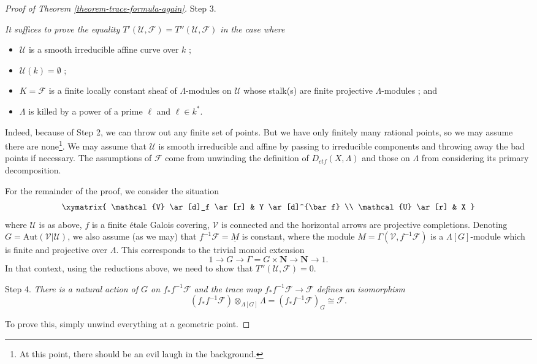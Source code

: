 \begin{proof}[Proof of Theorem \ref{theorem-trace-formula-again}]
\medskip\noindent
Step 3. {\it It suffices to prove the equality
$T'(\mathcal{U}, \mathcal{F}) = T''(\mathcal{U}, \mathcal{F})$
in the case where
\begin{itemize}
\item $\mathcal{U}$ is a smooth irreducible affine curve over $k$ ;
\item $\mathcal{U}(k) = \emptyset$ ;
\item $K=\mathcal{F}$ is a finite locally constant sheaf of $\Lambda$-modules
on $\mathcal{U}$ whose stalk(s) are finite projective $\Lambda$-modules ; and
\item $\Lambda$ is killed by a power of a prime $\ell$ and $\ell \in k^*$.
\end{itemize}
}

\medskip\noindent
Indeed, because of Step 2, we can throw out any finite set of points. But we
have only finitely many rational points, so we may assume there are
none\footnote{At this point, there should be an evil laugh in the background.}.
We may assume that $\mathcal{U}$ is smooth irreducible and affine by passing to
irreducible components and throwing away the bad points if necessary. The
assumptions of $\mathcal{F}$ come from unwinding the definition of
$D_{ctf}(X, \Lambda)$ and those on $\Lambda$ from considering its primary
decomposition.

\medskip\noindent
For the remainder of the proof, we consider the situation
$$
\xymatrix{
\mathcal{V} \ar[d]_f \ar[r] & Y \ar[d]^{\bar f} \\	
\mathcal{U} \ar[r] & X
}
$$
where $\mathcal{U}$ is as above, $f$ is a finite \'etale Galois covering,
$\mathcal{V}$ is connected and the horizontal arrows are projective
completions. Denoting $G=\text{Aut}(\mathcal{V}|\mathcal{U})$, we also assume
(as we may) that $f^{-1}\mathcal{F} =\underline M$ is constant, where the
module $M = \Gamma(\mathcal{V}, f^{-1}\mathcal{F})$ is a $\Lambda[G]$-module
which is finite and projective over $\Lambda$. This corresponds to the trivial
monoid extension
$$
1\to G\to \Gamma=G \times \mathbf{N}\to \mathbf{N}\to 1.
$$
In that context, using the reductions above, we need to show that
$T''(\mathcal{U}, \mathcal{F}) = 0$.

\medskip\noindent
Step 4. {\it There is a natural action of $G$ on $f_*f^{-1}\mathcal{F}$ and
the trace map $f_*f^{-1}\mathcal{F}\to \mathcal{F}$ defines an isomorphism}
$$
(f_*f^{-1}\mathcal{F})\otimes_{\Lambda[G]} \Lambda=(f_*f^{-1}\mathcal{F})_G
\cong \mathcal{F}.
$$

\medskip\noindent
To prove this, simply unwind everything at a geometric point.


\end{proof}
